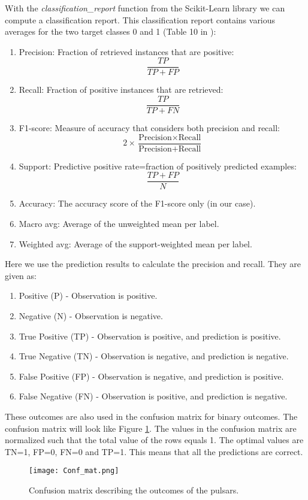 \documentclass[12pt,a4paper,english]{article}
\begin{document}
With the \textit{classification\_report} function from the Scikit-Learn library we can compute a classification report. This classification report contains various averages for the two target classes 0 and 1 (Table 10 in \citet{pulsar_art}):
\begin{enumerate}
	\item Precision: Fraction of retrieved instances that are positive: \[\frac{TP}{TP+FP}\]
	\item Recall: Fraction of positive instances that are retrieved:
	\[\frac{TP}{TP+FN}\]
	\item F1-score: Measure of accuracy that considers both precision and recall:
	\[2\times\frac{\text{Precision}\times\text{Recall}}{\text{Precision}+\text{Recall}}\]
	\item Support: Predictive positive rate=fraction of positively predicted examples:
	\[\frac{TP+FP}{N}\]
	\item Accuracy: The accuracy score of the F1-score only (in our case).
	\item Macro avg: Average of the unweighted mean per label.
	\item Weighted avg: Average of the support-weighted mean per label.
\end{enumerate}
Here we use the prediction results to calculate the precision and recall. They are given as:
\begin{enumerate}
	\item[] Positive (P) - Observation is positive.
	\item[] Negative (N) - Observation is negative.
	\item[] True Positive (TP) - Observation is positive, and prediction is positive.
	\item[] True Negative (TN) - Observation is negative, and prediction is negative.
	\item[] False Positive (FP) - Observation is negative, and prediction is positive.
	\item[] False Negative (FN) - Observation is positive, and prediction is negative.
\end{enumerate}

These outcomes are also used in the confusion matrix for binary outcomes. The confusion matrix will look like Figure \ref{fig:conf_mat}. The values in the confusion matrix are normalized such that the total value of the rows equals 1. The optimal values are TN=1, FP=0, FN=0 and TP=1. This means that all the predictions are correct.

\begin{figure}[h!]
	\centering\texttt{[image: Conf\_mat.png]}
	\caption{Confusion matrix describing the outcomes of the pulsars.\label{fig:conf_mat}}
\end{figure} 
\end{document}
